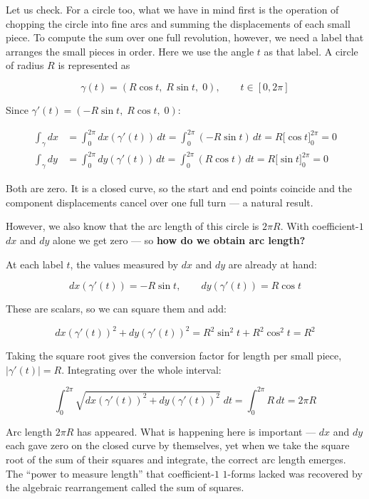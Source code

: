 Let us check. For a circle too, what we have in mind first is the
operation of chopping the circle into fine arcs and summing the
displacements of each small piece. To compute the sum over one full
revolution, however, we need a label that arranges the small pieces in
order. Here we use the angle \(t\) as that label. A circle of radius
\(R\) is represented as

\[\gamma(t) = (R\cos t,\; R\sin t,\; 0),\qquad t \in [0, 2\pi]\]

Since \(\gamma'(t) = (-R\sin t,\; R\cos t,\; 0)\):

\[\begin{aligned}
\int_\gamma dx &= \int_0^{2\pi} dx(\gamma'(t))\,dt = \int_0^{2\pi} (-R\sin t)\,dt = R\bigl[\cos t\bigr]_0^{2\pi} = 0 \\[4pt]
\int_\gamma dy &= \int_0^{2\pi} dy(\gamma'(t))\,dt = \int_0^{2\pi} (R\cos t)\,dt = R\bigl[\sin t\bigr]_0^{2\pi} = 0
\end{aligned}\]

Both are zero. It is a closed curve, so the start and end points
coincide and the component displacements cancel over one full turn --- a
natural result.

However, we also know that the arc length of this circle is \(2\pi R\).
With coefficient-\(1\) \(dx\) and \(dy\) alone we get zero --- so
\textbf{how do we obtain arc length?}

At each label \(t\), the values measured by \(dx\) and \(dy\) are
already at hand:

\[
dx(\gamma'(t)) = -R\sin t,\qquad dy(\gamma'(t)) = R\cos t
\]

These are scalars, so we can square them and add:

\[dx(\gamma'(t))^2 + dy(\gamma'(t))^2 = R^2\sin^2 t + R^2\cos^2 t = R^2\]

Taking the square root gives the conversion factor for length per small
piece, \(|\gamma'(t)| = R\). Integrating over the whole interval:

\[\int_0^{2\pi} \!\sqrt{dx(\gamma'(t))^2 + dy(\gamma'(t))^2}\;dt = \int_0^{2\pi} \!R\,dt = 2\pi R\]

Arc length \(2\pi R\) has appeared. What is happening here is important
--- \(dx\) and \(dy\) each gave zero on the closed curve by themselves,
yet when we take the square root of the sum of their squares and
integrate, the correct arc length emerges. The ``power to measure
length'' that coefficient-\(1\) \(1\)-forms lacked was recovered by the
algebraic rearrangement called the sum of squares.


